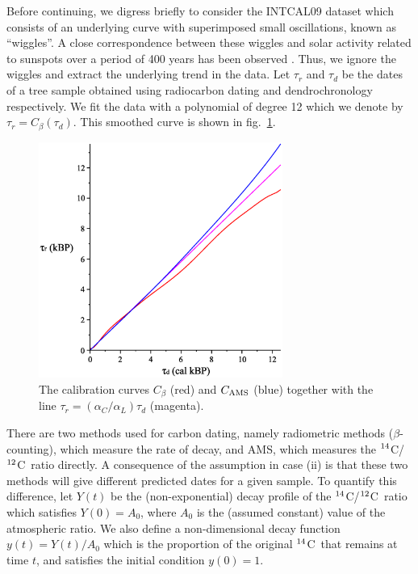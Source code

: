 \documentclass[12pt]{article}
\newcommand{\cft}{$^{\rm 14}$C}
\newcommand{\ctw}{$^{\rm 12}$C}
\begin{document}
Before continuing, we digress briefly to consider the INTCAL09 dataset
\cite{reimer09} which consists
of an underlying curve with superimposed small oscillations, known
as ``wiggles''. A close correspondence between these wiggles and solar
activity related to sunspots over a period of 400 years has been observed
\cite{bard98,stuiver61}. Thus, we ignore the wiggles and extract the 
underlying trend in the data. Let $\tau_r$ and $\tau_d$ be the dates of 
a tree sample obtained using radiocarbon dating and dendrochronology 
respectively. We fit the data with a polynomial of degree 12
which we denote by $\tau_r=C_\beta(\tau_d)$. This smoothed curve is
shown in fig.\ \ref{tauamsfig}.

\begin{figure}[t] 
\centerline{\includegraphics[width=8cm]{Aston-Fig2.eps}}
\vspace{-2mm}
\caption{The calibration curves $C_\beta$ (red) and $C_{\rm AMS}$
(blue) together with the line $\tau_r=(\alpha_C/\alpha_L)\tau_d$
(magenta).} 
\label{tauamsfig}
\end{figure}

There are two methods used for carbon dating, namely radiometric methods 
($\beta$-counting),
which measure the rate of decay, and AMS, which measures the
\cft/\ctw~ratio directly. A consequence of the assumption in case
(ii) is that these two methods will give different predicted dates 
for a given sample. To quantify this difference, let $Y(t)$ be the 
(non-exponential) decay profile of the \cft/\ctw~ratio
which satisfies $Y(0)=A_0$, where $A_0$ is the
(assumed constant) value of the atmospheric ratio. We also define a 
non-dimensional decay function $y(t)=Y(t)/A_0$ which is the proportion of
the original \cft~that remains at time $t$, and satisfies the initial 
condition $y(0)=1$.
\end{document}

